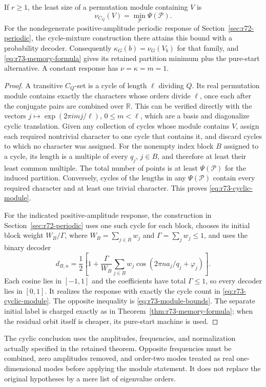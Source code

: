 \begin{proposition}
\label{prop:r73-cyclic-module}
If $r\ge1$, the least size of a permutation module containing $V$ is
\begin{equation}\label{eq:r73-cyclic-module}
 \nu_{C_Q}(V)=\min_{\mathcal P}\Psi(\mathcal P).
\end{equation}
For the nondegenerate positive-amplitude periodic response of
Section~\ref{sec:r72-periodic}, the cycle-mixture construction there
attains this bound with a probability decoder. Consequently
$\kappa_G(b)=\nu_G(V_b)$ for that family, and
\eqref{eq:r73-memory-formula} gives its retained partition minimum plus
the pure-start alternative. A constant response has $\nu=\kappa=m=1$.
\end{proposition}
\begin{proof}
A transitive $C_Q$-set is a cycle of length $\ell$ dividing $Q$.
Its real permutation module contains exactly the characters whose orders
divide $\ell$, once each after the conjugate pairs are combined over
$\mathbb R$. This can be verified directly with the vectors
$j\mapsto\exp(2\pi imj/\ell)$, $0\le m<\ell$, which are a basis and
diagonalize cyclic translation. Given any collection of cycles whose
module contains $V$, assign each required nontrivial character to one
cycle that contains it, and discard cycles to which no character was
assigned. For the nonempty index block $B$ assigned to a cycle, its
length is a multiple of every $q_j$, $j\in B$, and therefore at least
their least common multiple. The total number of points is at least
$\Psi(\mathcal P)$ for the induced partition. Conversely, cycles of
the lengths in any $\Psi(\mathcal P)$ contain every required character
and at least one trivial character. This proves \eqref{eq:r73-cyclic-module}.

For the indicated positive-amplitude response, the construction in
Section~\ref{sec:r72-periodic} uses one such cycle for each block,
chooses its initial block weight $W_B/\Gamma$, where
$W_B=\sum_{j\in B}w_j$ and $\Gamma=\sum_jw_j\le1$, and uses the binary
decoder
\[
 d_{B,n}=\frac12\left[1+\frac{\Gamma}{W_B}
       \sum_{j\in B}w_j\cos(2\pi n a_j/q_j+\varphi_j)\right].
\]
Each cosine lies in $[-1,1]$ and the coefficients have total $\Gamma\le1$,
so every decoder lies in $[0,1]$. It realizes the response with exactly
the cycle count in \eqref{eq:r73-cyclic-module}. The opposite inequality
is \eqref{eq:r73-module-bounds}. The separate initial label is charged
exactly as in Theorem~\ref{thm:r73-memory-formula}; when the residual
orbit itself is cheaper, its pure-start machine is used.
\end{proof}

The cyclic conclusion uses the amplitudes, frequencies, and normalization
actually specified in the retained theorem. Opposite frequencies must be
combined, zero amplitudes removed, and order-two modes treated as real
one-dimensional modes before applying the module statement. It does not
replace the original hypotheses by a mere list of eigenvalue orders.
